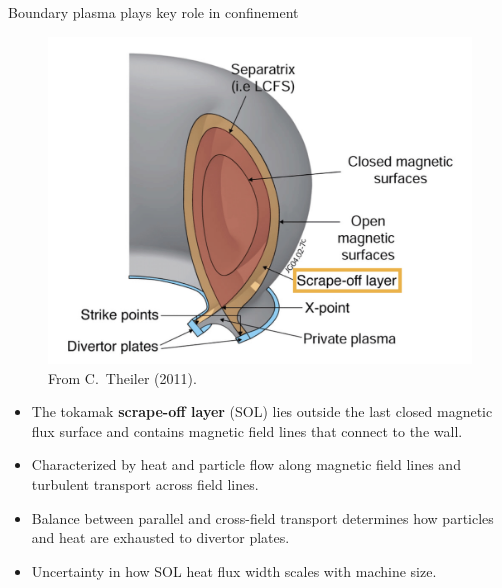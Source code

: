 \documentclass[12pt,table]{beamer}
\begin{document}
\begin{frame}{Boundary plasma plays key role in confinement}
    \begin{minipage}{.4\linewidth}
    \vspace{-1cm}
    \begin{figure}
        \centering%
        \includegraphics[width=1.2\linewidth,clip,trim = 5cm 0cm 0cm 0cm]{figs/sol-labeled.jpg} \\
        \tiny From C.~Theiler (2011). %
    \end{figure}
    \end{minipage}%
    \begin{minipage}{.6\linewidth}%
        \begin{itemize} \footnotesize
        \item The tokamak \textbf{\textcolor{UT_orange}{scrape-off layer}} (SOL) lies outside the last closed magnetic flux surface and contains magnetic field lines that connect to the wall.
        \item Characterized by heat and particle flow along magnetic field lines and turbulent transport across field lines.
        \item Balance between parallel and cross-field transport determines how particles and heat are exhausted to divertor plates.
        \item Uncertainty in how SOL heat flux width scales with machine size.
        \end{itemize}
    \end{minipage}
\end{frame}
\end{document}

